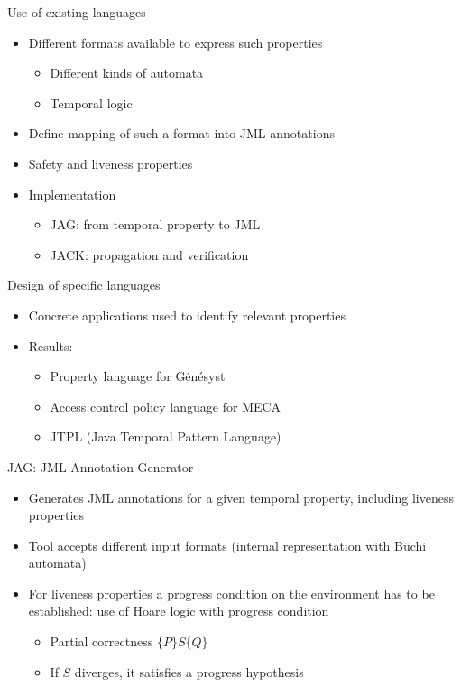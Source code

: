 \documentclass[final,nocolorBG,a4,marieke,nototal,ps, accumulate,slideColor]{prosper}
\begin{document}
\begin{slide}{Use of existing languages}
\begin{itemize}
\item Different formats available to express such properties
\begin{itemize}
\item Different kinds of automata
\item Temporal logic
\end{itemize}
\item Define mapping of such a format into JML annotations
\item Safety and liveness properties
\item Implementation 
\begin{itemize}
\item JAG: from temporal property to JML
\item JACK: propagation and verification
\end{itemize}
\end{itemize}
\end{slide}

\begin{slide}{Design of specific languages}
\begin{itemize}
\item Concrete applications used to identify relevant properties
\item Results: 
\begin{itemize}
\item Property language for G\'en\'esyst 
\item Access control policy language for MECA
\item JTPL (Java Temporal Pattern Language)
\end{itemize}
\end{itemize}
\end{slide}

\begin{slide}{JAG: JML Annotation Generator}
\begin{itemize}
\item Generates JML annotations for a given temporal property,
including liveness properties
\item Tool accepts different input formats (internal representation
with B\"uchi automata)
\item For liveness properties a progress condition on the environment
has to be established: use of Hoare logic with progress condition
\Red{\[\{|P|\}S\{|Q|\}\]}
\vspace*{-1em}
\begin{itemize}
\item Partial correctness \(\{P\}S\{Q\}\)
\item If \(S\) diverges, it satisfies a progress hypothesis
\end{itemize}
\end{itemize}
\end{slide}
\end{document}
